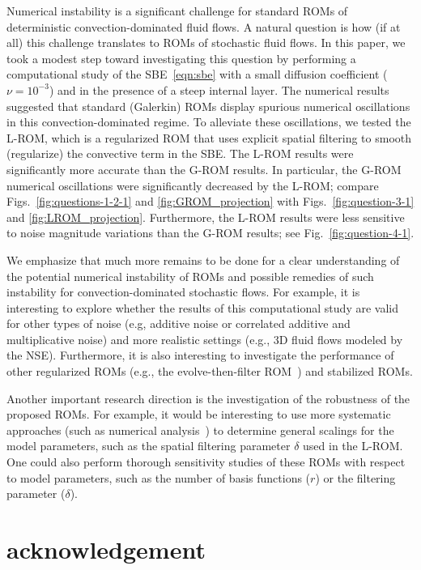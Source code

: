 \documentclass[11pt]{amsart}
\numberwithin{equation}{section}
\begin{document}
Numerical instability is a significant challenge for standard ROMs of deterministic convection-dominated fluid flows.
A natural question is how (if at all) this challenge translates to ROMs of stochastic fluid flows.
In this paper, we took a modest step toward investigating this question by performing a computational study of the SBE~\eqref{eqn:sbe} with a small diffusion coefficient ($\nu = 10^{-3}$) and in the presence of a steep internal layer.
The numerical results suggested that standard (Galerkin) ROMs display spurious numerical oscillations in this convection-dominated regime.
To alleviate these oscillations, we tested the L-ROM, which is a regularized ROM that uses explicit spatial filtering to smooth (regularize) the convective term in the SBE.
The L-ROM results were significantly more accurate than the G-ROM results.
In particular, the G-ROM numerical oscillations were significantly decreased by the L-ROM; compare Figs.~\ref{fig:questions-1-2-1} and \ref{fig:GROM_projection} with Figs.~\ref{fig:question-3-1} and \ref{fig:LROM_projection}. Furthermore, the L-ROM results were less sensitive to noise magnitude variations than the G-ROM results; see Fig.~\ref{fig:question-4-1}.

We emphasize that much more remains to be done for a clear understanding of the potential numerical instability of ROMs and possible remedies of such instability for convection-dominated stochastic flows. 
For example, it is interesting to explore whether the results of this computational study are valid for other types of noise (e.g, additive noise or correlated additive and multiplicative noise) and more realistic settings (e.g., 3D fluid flows modeled by the NSE). Furthermore, it is also interesting to investigate the performance of other regularized ROMs (e.g., the evolve-then-filter ROM~\cite{wells2016regularized}) and stabilized ROMs. 

Another important research direction is the investigation of the robustness of the proposed ROMs.
For example, it would be interesting to use more systematic approaches (such as numerical analysis~\cite{giere2015supg}) to determine general scalings for the model parameters, such as the spatial filtering parameter $\delta$ used in the L-ROM.
One could also perform thorough sensitivity studies of these ROMs with respect to model parameters, such as the number of basis functions ($r$) or the filtering parameter ($\delta$).


\section*{acknowledgement}
\end{document}
